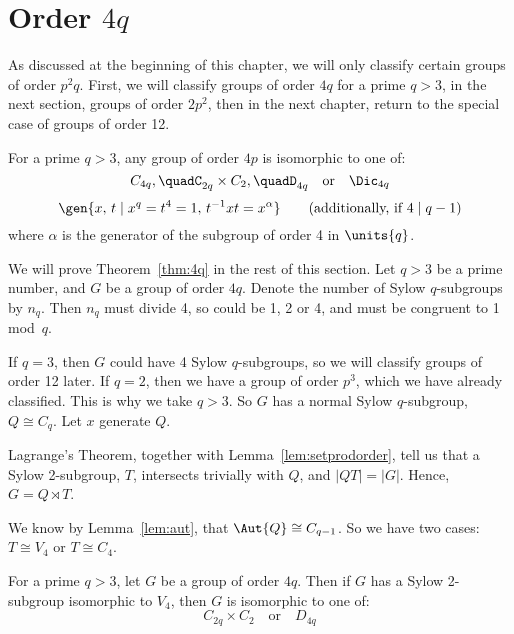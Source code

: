 \section{Order \(4q\)}
As discussed at the beginning of this chapter, we will only classify certain groups of order \(p^2 q\).
First, we will classify groups of order \(4q\) for a prime \(q > 3\), in the next section, groups of order \(2p^2\),
then in the next chapter, return to the special case of groups of order 12.

\begin{theorem}\label{thm:4q}
    For a prime \(q > 3\), any group of order \(4p\) is isomorphic to one of:
    \[%
        C_{4q}, \quad%
        C_{2q} \times C_2, \quad%
        D_{4q} \quad \text{or} \quad%
        \Dic_{4q}
    \]
    \[
        \gen{x,\, t \mid x^q = t^4 = 1,\, t^{-1}xt = x^\alpha} \tag{additionally, if \(4 \mid q-1\)}
    \]
    where \(\alpha\) is the generator of the subgroup of order 4 in \(\units{q}\).
\end{theorem}

We will prove Theorem~\ref{thm:4q} in the rest of this section.
Let \(q > 3\) be a prime number, and \(G\) be a group of order \(4q\).
Denote the number of Sylow \(q\)-subgroups by \(n_q\).
Then \(n_q\) must divide 4, so could be 1, 2 or 4, and must be congruent to 1 mod~\(q\).

If \(q = 3\), then \(G\) could have 4 Sylow \(q\)-subgroups, so we will classify groups of order 12 later.
If \(q = 2\), then we have a group of order \(p^3\), which we have already classified.
This is why we take \(q > 3\).
So \(G\) has a normal Sylow \(q\)-subgroup, \(Q \cong C_q\).
Let \(x\) generate \(Q\).

Lagrange's Theorem, together with Lemma~\ref{lem:setprodorder}, tell us that a Sylow 2-subgroup, \(T\), intersects
trivially with \(Q\), and \(|QT| = |G|\).
Hence, \(G = Q \rtimes T\).

We know by Lemma~\ref{lem:aut}, that \(\Aut{Q} \cong C_{q-1}\).
So we have two cases: \(T \cong V_4\) or \(T \cong C_4\).

\begin{lemma}
    For a prime \(q > 3\), let \(G\) be a group of order \(4q\).
    Then if \(G\) has a Sylow 2-subgroup isomorphic to \(V_{4}\), then \(G\) is isomorphic to one of:
    \[%
        C_{2q} \times C_2 \quad \text{or} \quad%
        D_{4q}%
    \]
\end{lemma}

